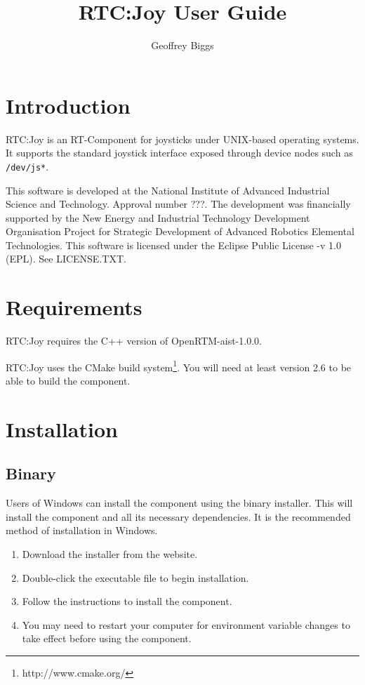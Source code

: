 \documentclass[a4paper,10pt]{article}
\title{RTC:Joy User Guide}
\author{Geoffrey Biggs}
\begin{document}
\maketitle

\section{Introduction}
\label{sec:intro}

RTC:Joy is an RT-Component for joysticks under UNIX-based operating systems. It
supports the standard joystick interface exposed through device nodes such as
\verb|/dev/js*|.

This software is developed at the National Institute of Advanced Industrial
Science and Technology. Approval number ???. The development was
financially supported by the New Energy and Industrial Technology Development
Organisation Project for Strategic Development of Advanced Robotics Elemental
Technologies.  This software is licensed under the Eclipse Public License -v
1.0 (EPL). See LICENSE.TXT.

\section{Requirements}
\label{sec:requirements}

RTC:Joy requires the C++ version of OpenRTM-aist-1.0.0.

RTC:Joy uses the CMake build system\footnote{http://www.cmake.org/}. You will
need at least version 2.6 to be able to build the component.

\section{Installation}
\label{sec:installation}

\subsection{Binary}

Users of Windows can install the component using the binary installer. This
will install the component and all its necessary dependencies. It is the
recommended method of installation in Windows.

\begin{enumerate}
  \item Download the installer from the website.
  \item Double-click the executable file to begin installation.
  \item Follow the instructions to install the component.
  \item You may need to restart your computer for environment variable changes
  to take effect before using the component.
\end{enumerate}
\end{document}
